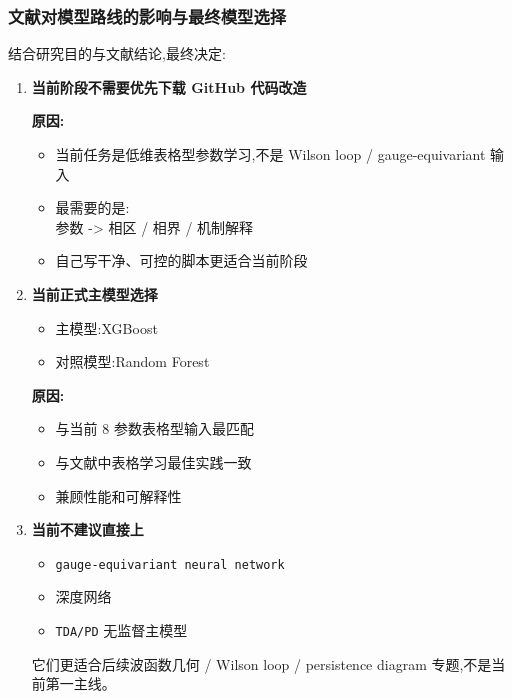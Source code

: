 \documentclass[lang=cn,scheme=chinese,color=blue,device=normal,toc=onecol,math=cm]{elegantbook}
\begin{document}
\subsubsection{文献对模型路线的影响与最终模型选择}


结合研究目的与文献结论,最终决定:\par


\begin{enumerate}
\item \textbf{当前阶段不需要优先下载 GitHub 代码改造}\par
 
\textbf{原因:}\par
 
\begin{itemize}
\item 当前任务是低维表格型参数学习,不是 Wilson loop /\allowbreak{} gauge-equivariant 输入
\item 最需要的是:\\ 参数 -> 相区 /\allowbreak{} 相界 /\allowbreak{} 机制解释
\item 自己写干净、可控的脚本更适合当前阶段
\end{itemize}
\item \textbf{当前正式主模型选择}\par
 
\begin{itemize}
\item 主模型:XGBoost
\item 对照模型:Random Forest
\end{itemize}
 
\textbf{原因:}\par
 
\begin{itemize}
\item 与当前 8 参数表格型输入最匹配
\item 与文献中表格学习最佳实践一致
\item 兼顾性能和可解释性
\end{itemize}
\item \textbf{当前不建议直接上}\par
 
\begin{itemize}
\item \texttt{gauge-equivariant neural network}
\item 深度网络
\item \texttt{TDA/\allowbreak{}PD} 无监督主模型
\end{itemize}
 
它们更适合后续波函数几何 /\allowbreak{} Wilson loop /\allowbreak{} persistence diagram 专题,不是当前第一主线。\par
\end{enumerate}
\end{document}
